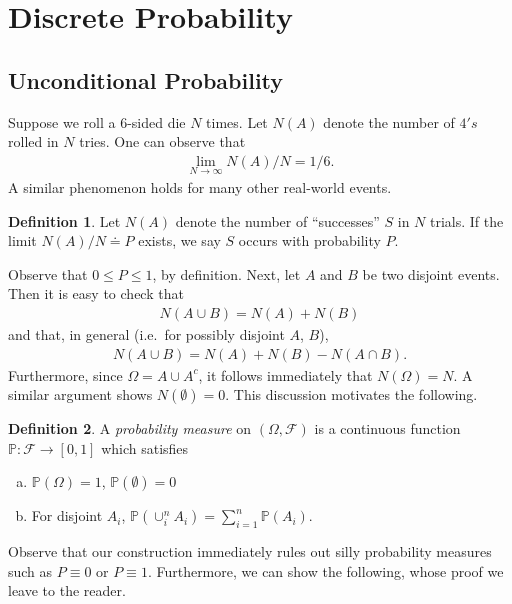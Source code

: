 \documentclass[12pt]{article}
\newcommand{\filter}{\mathcal{F}}
\newcommand{\prob}{\mathbb{P}}
\theoremstyle{plain}
\theoremstyle{definition}
\newtheorem*{definition}{Definition}
\theoremstyle{remark}
\numberwithin{equation}{section}  %
\begin{document}
\section{Discrete Probability}
\subsection{Unconditional Probability}
Suppose we roll a $6$-sided die $N$ times. Let $N(A)$ denote the number of $4's$
rolled in $N$ tries. One can observe that
\begin{align*}
    \lim_{N \to \infty} N(A)/N = 1/6.
\end{align*}
A similar phenomenon holds for many other real-world events.

\begin{definition}
    Let $N(A)$ denote the number of ``successes'' $S$ in $N$ trials. If the
    limit $N(A)/N \doteq P$ exists, we say $S$ occurs with probability $P$.
\end{definition}
Observe that $ 0 \le P \le 1$, by definition.
Next, let $A$ and $B$ be two disjoint events. Then
it is easy to check that
\begin{align*}
    N(A \cup B) = N(A) + N(B)
\end{align*}
and that, in general (i.e.\ for possibly disjoint $A$, $B$),
\begin{align*}
    N(A \cup B) = N(A) + N(B) - N(A \cap B).
\end{align*}
Furthermore, since $\Omega = A \cup A^c$, it follows immediately
that $N(\Omega) = N$. A similar argument shows $N(\emptyset) = 0$.
This discussion motivates the following.
\begin{definition}
    A \emph{probability measure} on $(\Omega, \filter)$ is a continuous function
    $\prob: \filter \to [0,1]$ which satisfies
    \begin{enumerate}[(a)]
        \item
            $\prob(\Omega) = 1$, $\prob(\emptyset) = 0$
        \item
            For disjoint $A_i$, $\prob(\cup_i^n A_i) = \sum_{i = 1}^n \prob(A_i)$.
    \end{enumerate}
\end{definition}
Observe that our construction immediately rules out silly probability
measures such as $P \equiv 0$ or $P \equiv 1$. Furthermore,
we can show the following, whose proof we leave to the reader.
\end{document}
